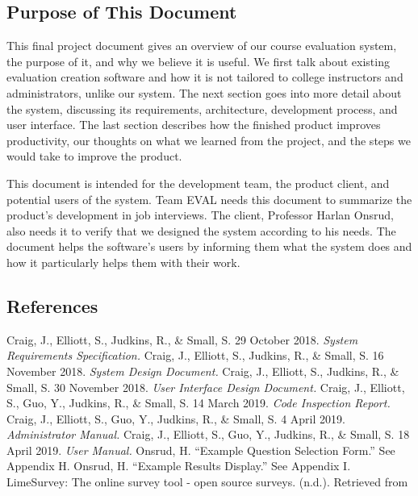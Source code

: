 \documentclass{article}
\begin{document}
\subsection{Purpose of This Document}

This final project document gives an overview of our course evaluation system, the purpose of it, and why we believe it is useful. We first talk about existing evaluation creation software and how it is not tailored to college instructors and administrators, unlike our system. The next section goes into more detail about the system, discussing its requirements, architecture, development process, and user interface. The last section describes how the finished product improves productivity, our thoughts on what we learned from the project, and the steps we would take to improve the product.

This document is intended for the development team, the product client, and potential users of the system. Team EVAL needs this document to summarize the product's development in job interviews. The client, Professor Harlan Onsrud, also needs it to verify that we designed the system according to his needs. The document helps the software's users by informing them what the system does and how it particularly helps them with their work.

\subsection{References}

Craig, J., Elliott, S., Judkins, R., \& Small, S. 29 October 2018. \textit{System Requirements Specification.}
\vspace{3mm}\newline
Craig, J., Elliott, S., Judkins, R., \& Small, S. 16 November 2018. \textit{System Design Document.}
\vspace{3mm}\newline
Craig, J., Elliott, S., Judkins, R., \& Small, S. 30 November 2018. \textit{User Interface Design Document.}
\vspace{3mm}\newline
Craig, J., Elliott, S., Guo, Y., Judkins, R., \& Small, S. 14 March 2019. \textit{Code Inspection Report.}
\vspace{3mm}\newline
Craig, J., Elliott, S., Guo, Y., Judkins, R., \& Small, S. 4 April 2019. \textit{Administrator Manual.}
\vspace{3mm}\newline
Craig, J., Elliott, S., Guo, Y., Judkins, R., \& Small, S. 18 April 2019. \textit{User Manual.}
\vspace{3mm}\newline
Onsrud, H. ``Example Question Selection Form.'' See Appendix H.
\vspace{3mm}\newline
Onsrud, H. ``Example Results Display.'' See Appendix I.
\vspace{3mm}\newline
LimeSurvey: The online survey tool - open source surveys. (n.d.). Retrieved from
\end{document}
